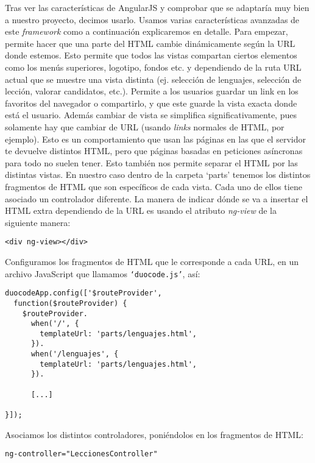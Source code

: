 Tras ver las características de AngularJS y comprobar que se adaptaría muy bien a nuestro proyecto, decimos usarlo. Usamos varias características avanzadas de este \emph{framework} como a continuación explicaremos en detalle. Para empezar, permite hacer que una parte del HTML cambie dinámicamente según la URL donde estemos. Esto permite que todos las vistas compartan ciertos elementos como los menús superiores, logotipo, fondos etc. y dependiendo de la ruta URL actual que se muestre una vista distinta (ej. selección de lenguajes, selección de lección, valorar candidatos, etc.). Permite a los usuarios guardar un link en los favoritos del navegador o compartirlo, y que este guarde la vista exacta donde está el usuario. Además cambiar de vista se simplifica significativamente, pues solamente hay que cambiar de URL (usando \emph{links} normales de HTML, por ejemplo). Esto es un comportamiento que usan las páginas en las que el servidor te devuelve distintos HTML, pero que páginas basadas en peticiones asíncronas para todo no suelen tener. Esto también nos permite separar el HTML por las distintas vistas. En nuestro caso dentro de la carpeta `parts' tenemos los distintos fragmentos de HTML que son específicos de cada vista. Cada uno de ellos tiene asociado un controlador diferente. La manera de indicar dónde se va a insertar el HTML extra dependiendo de la URL es usando el atributo \emph{ng-view} de la siguiente manera:

{\codesize
\begin{verbatim}
<div ng-view></div>
\end{verbatim}
}

Configuramos los fragmentos de HTML que le corresponde a cada URL, en un archivo JavaScript que llamamos \texttt{`duocode.js'}, así:

{\codesize
\lstset{}
\begin{lstlisting}[frame=single]
duocodeApp.config(['$routeProvider',
  function($routeProvider) {
    $routeProvider.
      when('/', {
        templateUrl: 'parts/lenguajes.html',
      }).
      when('/lenguajes', {
        templateUrl: 'parts/lenguajes.html',
      }).
      
      [...] 
      
}]);
\end{lstlisting}
}

Asociamos los distintos controladores, poniéndolos en los fragmentos de HTML:

{\codesize
\begin{verbatim}
ng-controller="LeccionesController"
\end{verbatim}
}

